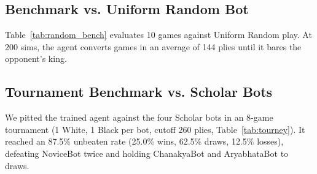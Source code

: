 \documentclass[11pt,a4paper,twocolumn]{article}
\begin{document}
\begin{table}[h]
\centering
\small
{}
\caption{Value Head material diagnostic probe matrix.}
\label{tab:probe}
\end{table}

\subsection{Benchmark vs. Uniform Random Bot}
Table~\ref{tab:random_bench} evaluates 10 games against Uniform Random play. At 200 sims, the agent converts games in an average of 144 plies until it bares the opponent's king.

\begin{table}[h]
\centering
\small
{}
\caption{Benchmark results vs. Uniform Random Bot (10 games).}
\label{tab:random_bench}
\end{table}

\subsection{Tournament Benchmark vs. Scholar Bots}
We pitted the trained agent against the four Scholar bots in an 8-game tournament (1 White, 1 Black per bot, cutoff 260 plies, Table~\ref{tab:tourney}). It reached an 87.5\% unbeaten rate (25.0\% wins, 62.5\% draws, 12.5\% losses), defeating NoviceBot twice and holding ChanakyaBot and AryabhataBot to draws.
\end{document}
